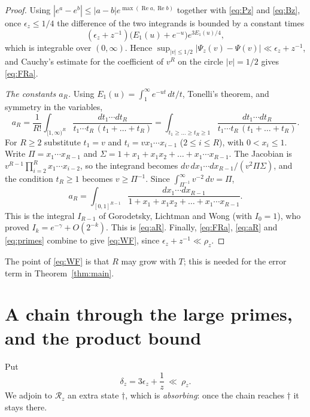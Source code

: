 \documentclass[11pt,a4paper]{article}
\numberwithin{equation}{section}
\theoremstyle{plain}
\theoremstyle{definition}
\theoremstyle{remark}
\newcommand{\cR}{\mathcal{R}}
\begin{document}
\begin{proof}
Using $|e^a-e^b|\le|a-b|e^{\max(\operatorname{Re}a,\operatorname{Re}b)}$ together with \eqref{eq:Pz} and \eqref{eq:Bz}, once $\epsilon_z\le1/4$ the difference of the two integrands is bounded by a constant times
\[
(\epsilon_z+z^{-1})\bigl(E_1(u)+e^{-u}\bigr)e^{3E_1(u)/4},
\]
which is integrable over $(0,\infty)$. Hence $\sup_{|v|\le1/2}|\Psi_z(v)-\Psi(v)|\ll\epsilon_z+z^{-1}$, and Cauchy's estimate for the coefficient of $v^R$ on the circle $|v|=1/2$ gives \eqref{eq:FRa}.

\emph{The constants $a_R$.} Using $E_1(u)=\int_1^\infty e^{-ut}\,dt/t$, Tonelli's theorem, and symmetry in the variables,
\[
a_R=\frac1{R!}\int_{[1,\infty)^R}\frac{dt_1\cdots dt_R}{t_1\cdots t_R\,(t_1+\dots+t_R)}
=\int_{t_1\ge\dots\ge t_R\ge1}\frac{dt_1\cdots dt_R}{t_1\cdots t_R\,(t_1+\dots+t_R)}.
\]
For $R\ge2$ substitute $t_1=v$ and $t_i=vx_1\cdots x_{i-1}$ ($2\le i\le R$), with $0<x_i\le1$. Write $\Pi=x_1\cdots x_{R-1}$ and $\Sigma=1+x_1+x_1x_2+\dots+x_1\cdots x_{R-1}$. The Jacobian is $v^{R-1}\prod_{i=2}^{R}x_1\cdots x_{i-2}$, so the integrand becomes $dv\,dx_1\cdots dx_{R-1}/(v^2\Pi\Sigma)$, and the condition $t_R\ge1$ becomes $v\ge\Pi^{-1}$. Since $\int_{\Pi^{-1}}^\infty v^{-2}\,dv=\Pi$,
\begin{equation}\label{eq:aRcube}
a_R=\int_{[0,1]^{R-1}}\frac{dx_1\cdots dx_{R-1}}{1+x_1+x_1x_2+\dots+x_1\cdots x_{R-1}}.
\end{equation}
This is the integral $I_{R-1}$ of Gorodetsky, Lichtman and Wong \cite[Theorem~1.6]{GLW} (with $I_0=1$), who proved $I_k=e^{-\gamma}+O(2^{-k})$. This is \eqref{eq:aR}. Finally, \eqref{eq:FRa}, \eqref{eq:aR} and \eqref{eq:primes} combine to give \eqref{eq:WF}, since $\epsilon_z+z^{-1}\ll\rho_z$.
\end{proof}

The point of \eqref{eq:WF} is that $R$ may grow with $T$; this is needed for the error term in Theorem~\ref{thm:main}.

\section{A chain through the large primes, and the product bound}\label{sec:roughchain}

Put
\[
\delta_z=3\epsilon_z+\frac1z\ \ll\ \rho_z.
\]
We adjoin to $\cR_z$ an extra state $\dagger$, which is \emph{absorbing}: once the chain reaches $\dagger$ it stays there.
\end{document}
